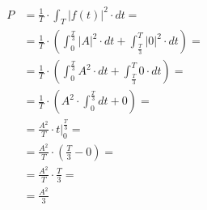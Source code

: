 \begin{task}
\begin{align*}
P&=\frac{1}{T} \cdot \int_{T}\left|f(t)\right|^2 \cdot dt =\\
&=\frac{1}{T} \cdot \left( \int_{0}^{\frac{T}{3}}\left| A \right|^2 \cdot dt + \int_{\frac{T}{3}}^{T}\left| 0 \right|^2 \cdot dt\right)=\\
&=\frac{1}{T} \cdot \left( \int_{0}^{\frac{T}{3}} A ^2 \cdot dt + \int_{\frac{T}{3}}^{T}0 \cdot dt\right)=\\
&=\frac{1}{T} \cdot \left( A ^2 \cdot \int_{0}^{\frac{T}{3}} dt + 0\right)=\\
&=\frac{A^2}{T} \cdot \left. t \right|_{0}^{\frac{T}{3}}=\\
&=\frac{A^2}{T} \cdot \left( \frac{T}{3} - 0 \right)=\\
&=\frac{A^2}{T} \cdot \frac{T}{3}=\\
&=\frac{A^2}{3}\\
\end{align*}

\end{task}